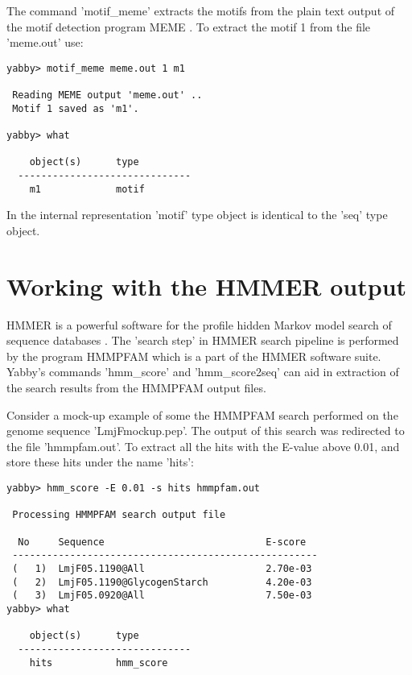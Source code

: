 
The command 'motif\_meme' extracts the motifs from the plain
text output of the motif detection program MEME \cite{meme}.
To extract the motif 1 from the file 'meme.out' use:

\begin{verbatim}
yabby> motif_meme meme.out 1 m1 

 Reading MEME output 'meme.out' ..
 Motif 1 saved as 'm1'.

yabby> what

    object(s)      type
  ------------------------------
    m1             motif         
\end{verbatim}

In the internal representation 'motif' type object is identical to
the 'seq' type object.

\section{Working with the HMMER output}


HMMER is a powerful software for the profile hidden Markov model
search of sequence databases \cite{hmmer,wwwhmmer}. The 'search 
step' in HMMER search pipeline is performed by the program
HMMPFAM which is a part of the HMMER software suite. Yabby's
commands 'hmm\_score' and 'hmm\_score2seq' can aid in extraction
of the search results from the HMMPFAM output files.

Consider a mock-up example of some the HMMPFAM search performed
on the genome sequence 'LmjFmockup.pep'. The output of this search
was redirected to the file 'hmmpfam.out'. To extract all the hits
with the E-value above 0.01, and store these hits under the name
'hits':

\begin{verbatim}
yabby> hmm_score -E 0.01 -s hits hmmpfam.out

 Processing HMMPFAM search output file

  No     Sequence                            E-score
 -----------------------------------------------------
 (   1)  LmjF05.1190@All                     2.70e-03
 (   2)  LmjF05.1190@GlycogenStarch          4.20e-03
 (   3)  LmjF05.0920@All                     7.50e-03
yabby> what

    object(s)      type
  ------------------------------
    hits           hmm_score     
\end{verbatim}

